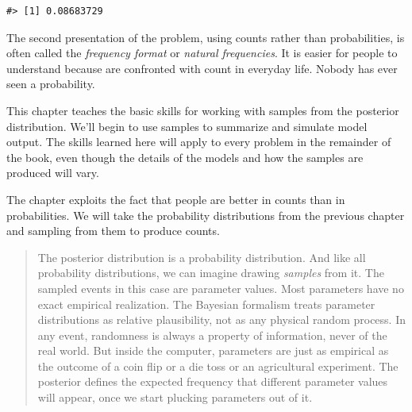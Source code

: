 \documentclass[
  letterpaper,
  DIV=11,
  numbers=noendperiod]{scrreprt}
\begin{document}
\begin{verbatim}
#> [1] 0.08683729
\end{verbatim}

The second presentation of the problem, using counts rather than
probabilities, is often called the \emph{frequency format} or
\emph{natural frequencies}. It is easier for people to understand
because are confronted with count in everyday life. Nobody has ever seen
a probability.

\begin{tcolorbox}[enhanced jigsaw, colframe=quarto-callout-note-color-frame, colback=white, toprule=.15mm, breakable, arc=.35mm, bottomtitle=1mm, colbacktitle=quarto-callout-note-color!10!white, toptitle=1mm, titlerule=0mm, title=\textcolor{quarto-callout-note-color}{\faInfo}\hspace{0.5em}{Meta remark: Study guide}, leftrule=.75mm, opacityback=0, rightrule=.15mm, opacitybacktitle=0.6, bottomrule=.15mm, left=2mm, coltitle=black]

This chapter teaches the basic skills for working with samples from the
posterior distribution. We'll begin to use samples to summarize and
simulate model output. The skills learned here will apply to every
problem in the remainder of the book, even though the details of the
models and how the samples are produced will vary.

The chapter exploits the fact that people are better in counts than in
probabilities. We will take the probability distributions from the
previous chapter and sampling from them to produce counts.

\end{tcolorbox}

\begin{quote}
The posterior distribution is a probability distribution. And like all
probability distributions, we can imagine drawing \emph{samples} from
it. The sampled events in this case are parameter values. Most
parameters have no exact empirical realization. The Bayesian formalism
treats parameter distributions as relative plausibility, not as any
physical random process. In any event, randomness is always a property
of information, never of the real world. But inside the computer,
parameters are just as empirical as the outcome of a coin flip or a die
toss or an agricultural experiment. The posterior defines the expected
frequency that different parameter values will appear, once we start
plucking parameters out of it.
\end{quote}
\end{document}
